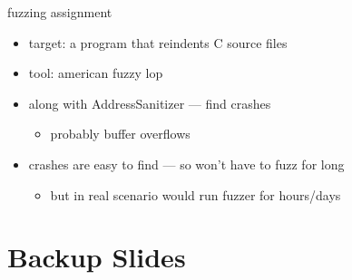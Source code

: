\begin{frame}{fuzzing assignment}
    \begin{itemize}
    \item target: a program that reindents C source files
    \item tool: american fuzzy lop
    \item along with AddressSanitizer --- find crashes
        \begin{itemize}
            \item probably buffer overflows
        \end{itemize}
    \item crashes are easy to find --- so won't have to fuzz for long
        \begin{itemize}
        \item but in real scenario would run fuzzer for hours/days
        \end{itemize}
    \end{itemize}
\end{frame}

\section{Backup Slides}
